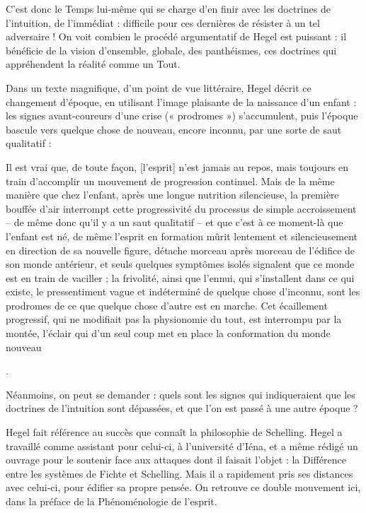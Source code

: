 C’est donc le Temps lui-même qui se charge d’en finir avec les doctrines de l’intuition, de l’immédiat : difficile pour ces dernières de résister à un tel adversaire ! On voit combien le procédé argumentatif de Hegel est puissant : il bénéficie de la vision d’ensemble, globale, des panthéismes, ces doctrines qui appréhendent la réalité comme un Tout.

Dans un texte magnifique, d’un point de vue littéraire, Hegel décrit ce changement d’époque, en utilisant l’image plaisante de la naissance d’un enfant : les signes avant-coureurs d’une crise (« prodromes ») s’accumulent, puis l’époque bascule vers quelque chose de nouveau, encore inconnu, par une sorte de saut qualitatif :

    Il est vrai que, de toute façon, [l’esprit] n’est jamais au repos, mais toujours en train d’accomplir un mouvement de progression continuel. Mais de la même manière que chez l’enfant, après une longue nutrition silencieuse, la première bouffée d’air interrompt cette progressivité du processus de simple accroissement – de même donc qu’il y a un saut qualitatif – et que c’est à ce moment-là que l’enfant est né, de même l’esprit en formation mûrit lentement et silencieusement en direction de sa nouvelle figure, détache morceau après morceau de l’édifice de son monde antérieur, et seuls quelques symptômes isolés signalent que ce monde est en train de vaciller ; la frivolité, ainsi que l’ennui, qui s’installent dans ce qui existe, le pressentiment vague et indéterminé de quelque chose d’inconnu, sont les prodromes de ce que quelque chose d’autre est en marche. Cet écaillement progressif, qui ne modifiait pas la physionomie du tout, est interrompu par la montée, l’éclair qui d’un seul coup met en place la conformation du monde nouveau

.


Néanmoins, on peut se demander : quels sont les signes qui indiqueraient que les doctrines de l’intuition sont dépassées, et que l’on est passé à une autre époque ?

Hegel fait référence au succès que connaît la philosophie de Schelling. Hegel a travaillé comme assistant pour celui-ci, à l’université d’Iéna, et a même rédigé un ouvrage pour le soutenir face aux attaques dont il faisait l’objet : la Différence entre les systèmes de Fichte et Schelling. Mais il a rapidement pris ses distances avec celui-ci, pour édifier sa propre pensée. On retrouve ce double mouvement ici, dans la préface de la Phénoménologie de l’esprit.

